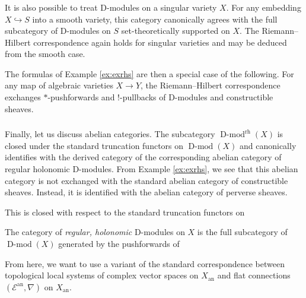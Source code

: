 \documentclass[10pt]{amsart}
\newcommand{\on}{\operatorname}
\theoremstyle{remark}
\newcommand{\sE}{\mathscr{E}}
\numberwithin{equation}{section}
\begin{document}
	\subsubsection{}  It is also possible to treat D-modules on a singular 
	variety $X$. For any embedding $X \hookrightarrow S$ into a smooth variety, 
	this category canonically agrees with the full subcategory of D-modules on $S$ 
	set-theoretically supported on $X$. The Riemann--Hilbert correspondence 
	again holds for singular varieties and may be deduced from the smooth 
	case. 
	
	
	The formulas of Example \ref{ex:exrhs} are then a special case of the 
	following. For any map of algebraic varieties $X \rightarrow Y$, the 
	Riemann--Hilbert correspondence exchanges $*$-pushforwards and 
	$!$-pullbacks of D-modules and constructible sheaves. 
	
	
	\subsubsection{} Finally, let us discuss abelian categories. The 
	subcategory $\on{D-mod}^{\on{rh}}(X)$ is closed under the standard 
	truncation functors on $\on{D-mod}(X)$ and canonically identifies with the 
	derived category of the corresponding abelian category of regular holonomic 
	D-modules. From Example \ref{ex:exrhs}, we see that this abelian category is not exchanged with 
	the standard abelian category of constructible sheaves. Instead, it is 
	identified with the abelian category of perverse sheaves. 
	
	
	\iffalse
	
	
	
	
	
	
	
	
	This is closed with respect to the standard truncation functors on 
	
	
	
	
	
	The category of {\em regular, holonomic} D-modules on $X$ is the full 
	subcategory of $\on{D-mod}(X)$ generated by the pushforwards of 
	
	
	
	
	
	
	From here, we want to use a variant of the standard correspondence between 
	topological local systems of complex vector spaces on $X_{\on{an}}$ and 
	flat connections $(\sE^{\on{an}}, \nabla)$ on $X_{\on{an}}$. 
	
	
	
	
	
\end{document}
